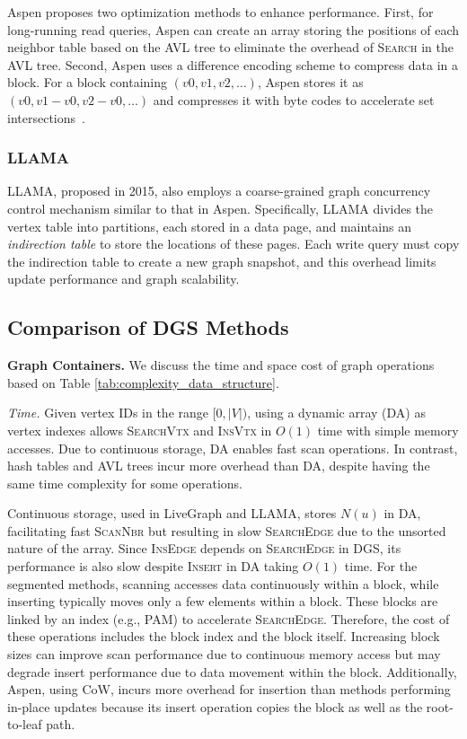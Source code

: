 Aspen proposes two optimization methods to enhance performance. First, for long-running read queries, Aspen can create an array storing the positions of each neighbor table based on the AVL tree to eliminate the overhead of \textsc{Search} in the AVL tree. Second, Aspen uses a difference encoding scheme to compress data in a block. For a block containing $(v0, v1, v2, \ldots)$, Aspen stores it as $(v0, v1 - v0, v2 - v0, \ldots)$ and compresses it with byte codes to accelerate set intersections~\cite{aberger2017emptyheaded}.

\subsubsection{\textbf{LLAMA}~\cite{macko2015llama}}

LLAMA, proposed in 2015, also employs a coarse-grained graph concurrency control mechanism similar to that in Aspen. Specifically, LLAMA divides the vertex table into partitions, each stored in a data page, and maintains an \emph{indirection table} to store the locations of these pages. Each write query must copy the indirection table to create a new graph snapshot, and this overhead limits update performance and graph scalability. 


\subsection{Comparison of DGS Methods} \label{sec:discussion}

\noindent\textbf{Graph Containers.} We discuss the time and space cost of graph operations based on Table \ref{tab:complexity_data_structure}.

\emph{Time.} Given vertex IDs in the range $[0, |V|)$, using a dynamic array (DA) as vertex indexes allows \textsc{SearchVtx} and \textsc{InsVtx} in $O(1)$ time with simple memory accesses. Due to continuous storage, DA enables fast scan operations. In contrast, hash tables and AVL trees incur more overhead than DA, despite having the same time complexity for some operations.

Continuous storage, used in LiveGraph and LLAMA, stores $N(u)$ in DA, facilitating fast \textsc{ScanNbr} but resulting in slow \textsc{SearchEdge} due to the unsorted nature of the array. Since \textsc{InsEdge} depends on \textsc{SearchEdge} in DGS, its performance is also slow despite \textsc{Insert} in DA taking $O(1)$ time. For the segmented methods, scanning accesses data continuously within a block, while inserting typically moves only a few elements within a block. These blocks are linked by an index (e.g., PAM) to accelerate \textsc{SearchEdge}. Therefore, the cost of these operations includes the block index and the block itself. Increasing block sizes can improve scan performance due to continuous memory access but may degrade insert performance due to data movement within the block. Additionally, Aspen, using CoW, incurs more overhead for insertion than methods performing in-place updates because its insert operation copies the block as well as the root-to-leaf path.

